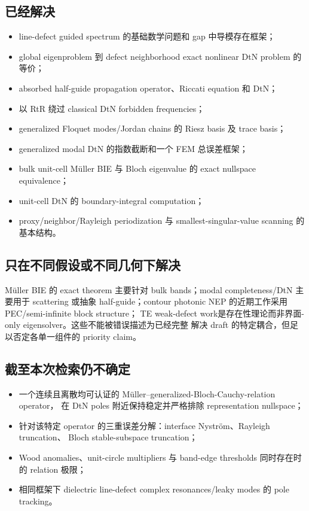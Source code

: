 \documentclass[UTF8,11pt,fontset=none]{ctexart}
\begin{document}
\subsection{已经解决}

\begin{itemize}
  \item line-defect guided spectrum 的基础数学问题和 gap 中导模存在框架；
  \item global eigenproblem 到 defect neighborhood exact nonlinear DtN problem 的等价；
  \item absorbed half-guide propagation operator、Riccati equation 和 DtN；
  \item 以 RtR 绕过 classical DtN forbidden frequencies；
  \item generalized Floquet modes/Jordan chains 的 Riesz basis 及 trace basis；
  \item generalized modal DtN 的指数截断和一个 FEM 总误差框架；
  \item bulk unit-cell Müller BIE 与 Bloch eigenvalue 的 exact nullspace equivalence；
  \item unit-cell DtN 的 boundary-integral computation；
  \item proxy/neighbor/Rayleigh periodization 与 smallest-singular-value scanning 的基本结构。
\end{itemize}

\subsection{只在不同假设或不同几何下解决}

Müller BIE 的 exact theorem 主要针对 bulk bands；modal completeness/DtN 主要用于 scattering
或抽象 half-guide；contour photonic NEP 的近期工作采用 PEC/semi-infinite block structure；
TE weak-defect work是存在性理论而非界面-only eigensolver。这些不能被错误描述为已经完整
解决 draft 的特定耦合，但足以否定各单一组件的 priority claim。

\subsection{截至本次检索仍不确定}

\begin{itemize}
  \item 一个连续且离散均可认证的 Müller--generalized-Bloch-Cauchy-relation operator，
    在 DtN poles 附近保持稳定并严格排除 representation nullspace；
  \item 针对该特定 operator 的三重误差分解：interface Nyström、Rayleigh truncation、
    Bloch stable-subspace truncation；
  \item Wood anomalies、unit-circle multipliers 与 band-edge thresholds 同时存在时的 relation
    极限；
  \item 相同框架下 dielectric line-defect complex resonances/leaky modes 的 pole tracking。
\end{itemize}
\end{document}
